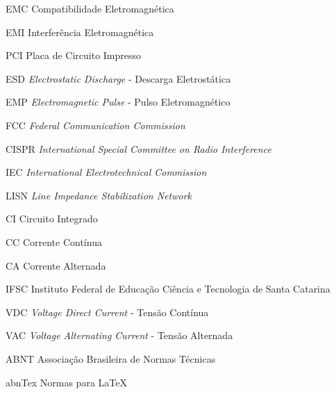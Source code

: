 \documentclass{ifscTCC} %
\begin{document}
\listoffigures*
\cleardoublepage

\listoftables*
\cleardoublepage

\begin{siglas}
   \item[EMC] Compatibilidade Eletromagnética
   \item[EMI] Interferência Eletromagnética
   \item[PCI] Placa de Circuito Impresso
   \item[ESD] \textit{Electrostatic Discharge} - Descarga Eletrostática
   \item[EMP] \textit{Electromagnetic Pulse} - Pulso Eletromagnético
   \item[FCC] \textit{Federal Communication Commission}
   \item[CISPR] \textit{International Special Committee on Radio Interference}
   \item[IEC] \textit{International Electrotechnical Commission}
   \item[LISN] \textit{Line Impedance Stabilization Network}
   \item[CI] Circuito Integrado
   \item[CC] Corrente Contínua
   \item[CA] Corrente Alternada
   \item[IFSC] Instituto Federal de Educação Ciência e Tecnologia de Santa Catarina
   \item[VDC] \textit{Voltage Direct Current} - Tensão Contínua
   \item[VAC] \textit{Voltage Alternating Current} - Tensão Alternada
   \item[ABNT] Associação Brasileira de Normas Técnicas
   \item[abnTex] Normas para \LaTeX
   \end{siglas}
\end{document}
